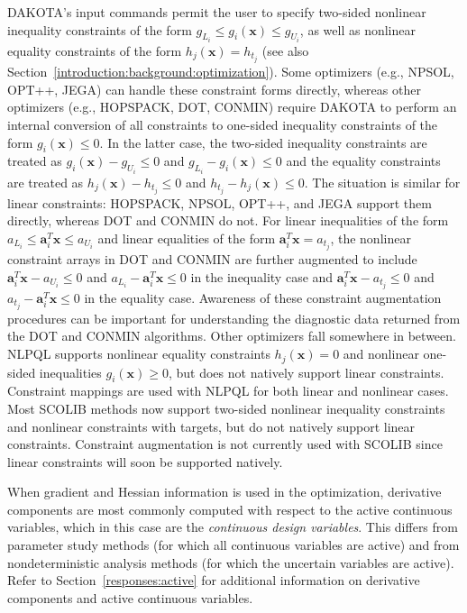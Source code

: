 DAKOTA's input commands permit the user to specify two-sided nonlinear
inequality constraints of the form $g_{L_{i}} \leq g_{i}(\mathbf{x})
\leq g_{U_{i}}$, as well as nonlinear equality constraints of the form
$h_{j}(\mathbf{x}) = h_{t_{j}}$ (see also
Section~\ref{introduction:background:optimization}). Some optimizers
(e.g., NPSOL, OPT++, JEGA) can handle these constraint forms directly,
whereas other optimizers (e.g., HOPSPACK, DOT, CONMIN) require DAKOTA
to perform an internal conversion of all constraints to one-sided
inequality constraints of the form $g_{i}(\mathbf{x}) \leq 0$. In the
latter case, the two-sided inequality constraints are treated as
$g_{i}(\mathbf{x}) - g_{U_{i}} \leq 0$ and $g_{L_{i}} -
g_{i}(\mathbf{x}) \leq 0$ and the equality constraints are treated as
$h_{j}(\mathbf{x}) - h_{t_{j}} \leq 0$ and $h_{t_{j}} -
h_{j}(\mathbf{x}) \leq 0$. The situation is similar for linear
constraints: HOPSPACK, NPSOL, OPT++, and JEGA support them directly,
whereas DOT and CONMIN do not.  For linear inequalities of the form
$a_{L_{i}} \leq \mathbf{a}_{i}^{T}\mathbf{x} \leq a_{U_{i}}$ and
linear equalities of the form $\mathbf{a}_{i}^{T}\mathbf{x} =
a_{t_{j}}$, the nonlinear constraint arrays in DOT and CONMIN are
further augmented to include $\mathbf{a}_{i}^{T}\mathbf{x} - a_{U_{i}}
\leq 0$ and $a_{L_{i}} - \mathbf{a}_{i}^{T}\mathbf{x} \leq 0$ in the
inequality case and $\mathbf{a}_{i}^{T}\mathbf{x} - a_{t_{j}} \leq 0$
and $a_{t_{j}} - \mathbf{a}_{i}^{T}\mathbf{x} \leq 0$ in the equality
case. Awareness of these constraint augmentation procedures can be
important for understanding the diagnostic data returned from the DOT
and CONMIN algorithms.  Other optimizers fall somewhere in between.
NLPQL supports nonlinear equality constraints $h_{j}(\mathbf{x}) = 0$
and nonlinear one-sided inequalities $g_{i}(\mathbf{x}) \geq 0$, but
does not natively support linear constraints.  Constraint mappings are
used with NLPQL for both linear and nonlinear cases.  Most SCOLIB
methods now support two-sided nonlinear inequality constraints and
nonlinear constraints with targets, but do not natively support linear
constraints.  Constraint augmentation is not currently used with
SCOLIB since linear constraints will soon be supported natively.

When gradient and Hessian information is used in the optimization,
derivative components are most commonly computed with respect to the
active continuous variables, which in this case are the
\emph{continuous design variables}. This differs from parameter study
methods (for which all continuous variables are active) and from
nondeterministic analysis methods (for which the uncertain variables
are active).  Refer to Section~\ref{responses:active} for additional
information on derivative components and active continuous variables.

